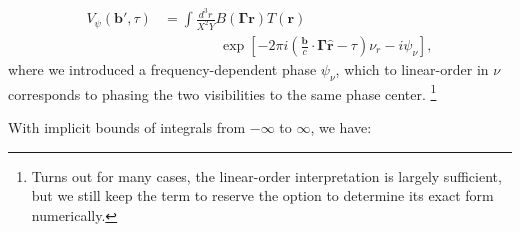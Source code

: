 \documentclass[twocolumn,apj,numberedappendix]{emulateapj}
\renewcommand\[{\begin{equation}}
\renewcommand\]{\end{equation}}
\begin{document}
\[
\begin{aligned}V_{\psi}(\boldsymbol{b'},\tau) & = \int\frac{d^{3}r}{X^{2}Y}B(\boldsymbol{\Gamma}\boldsymbol{r})T(\boldsymbol{r})\\
& \qquad \qquad  \exp\left[-2\pi i\left(\frac{\boldsymbol{b}}{c}\cdot\boldsymbol{\Gamma}\hat{\boldsymbol{r}}-\tau\right)\nu_{r}-i\psi_\nu\right],\end{aligned}
\]
where we introduced a frequency-dependent phase $\psi_{\nu}$, which to linear-order in $\nu$ corresponds to phasing the two visibilities to the same phase center. \footnote{Turns out for many cases, the linear-order interpretation is largely sufficient, but we still keep the term to reserve the option to determine its exact form numerically. } 

With implicit bounds of integrals from $-\infty$ to $\infty$, we have:
\end{document}
